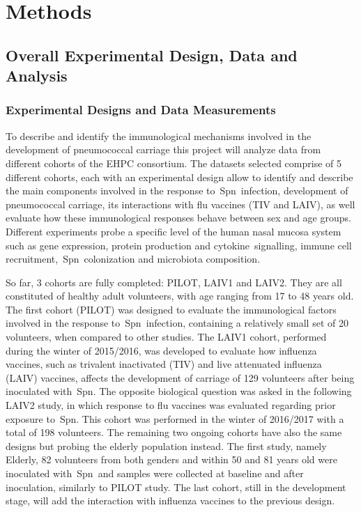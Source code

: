 \documentclass[
]{book}
\begin{document}
\hypertarget{methods}{%
\chapter{Methods}\label{methods}}

\hypertarget{overall-experimental-design-data-and-analysis}{%
\section{Overall Experimental Design, Data and Analysis}\label{overall-experimental-design-data-and-analysis}}

\hypertarget{experimental-designs-and-data-measurements}{%
\subsection{Experimental Designs and Data Measurements}\label{experimental-designs-and-data-measurements}}

To describe and identify the immunological mechanisms involved in the development of pneumococcal carriage this project will analyze data from different cohorts of the EHPC consortium. The datasets selected comprise of 5 different cohorts, each with an experimental design allow to identify and describe the main components involved in the response to~Spn~infection, development of pneumococcal carriage, its interactions with flu vaccines (TIV and LAIV), as well evaluate how these immunological responses behave between sex and age groups. Different experiments probe a specific level of the human nasal mucosa system such as gene expression, protein production and cytokine~signalling, immune cell recruitment,~Spn~colonization and microbiota composition.

So far, 3 cohorts are fully completed: PILOT, LAIV1 and LAIV2. They are all constituted of healthy adult volunteers, with age ranging from 17 to 48 years old. The first cohort (PILOT) was designed to evaluate the immunological factors involved in the response to~Spn~infection, containing a relatively small set of 20 volunteers, when compared to other studies. The LAIV1 cohort, performed during the winter of 2015/2016, was developed to evaluate how influenza vaccines, such as trivalent inactivated (TIV) and live attenuated influenza (LAIV) vaccines, affects the development of carriage of 129 volunteers after being inoculated with~Spn. The opposite biological question was asked in the following LAIV2 study, in which response to flu vaccines was evaluated regarding prior exposure to~Spn. This cohort was performed in the winter of 2016/2017 with a total of 198 volunteers. The remaining two ongoing cohorts have also the same designs but probing the elderly population instead. The first study, namely Elderly, 82 volunteers from both genders and within 50 and 81 years old were inoculated with~Spn~and samples were collected at baseline and after inoculation, similarly to PILOT study. The last cohort, still in the development stage, will add the interaction with influenza vaccines to the previous design.
\end{document}
